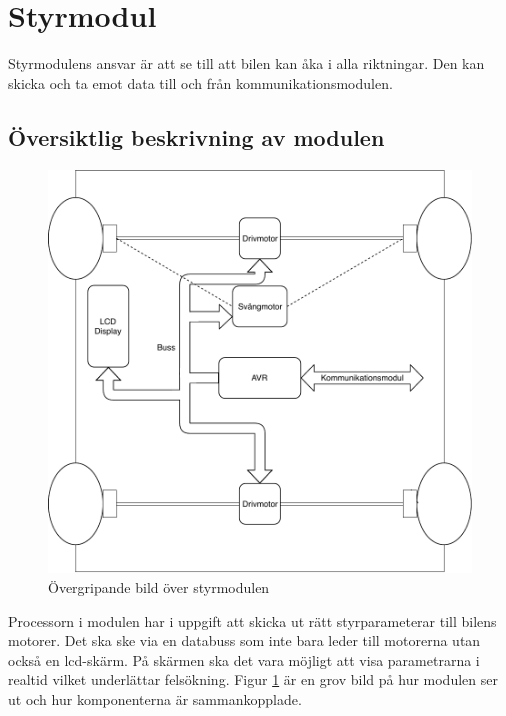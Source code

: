 \documentclass[systemskiss/skiss.tex]{subfiles}
\begin{document}
\section{Styrmodul}
Styrmodulens ansvar är att se till att bilen kan åka i alla riktningar. Den kan skicka och ta emot data till och från kommunikationsmodulen. 
\subsection{Översiktlig beskrivning av modulen}
\begin{figure}[h]
    \centering
    \includegraphics[width=0.6\linewidth]{systemskiss/figures/styrmodul.pdf}
    \caption{Övergripande bild över styrmodulen}
    \label{fig:styrskiss}
\end{figure}

Processorn i modulen har i uppgift att skicka ut rätt styrparameterar till
bilens motorer. Det ska ske via en databuss som inte bara leder till motorerna
utan också en lcd-skärm. På skärmen ska det vara möjligt att visa parametrarna i realtid vilket underlättar felsökning. Figur \ref{fig:styrskiss} är en grov bild på hur modulen ser ut och hur komponenterna är sammankopplade.
\end{document}
